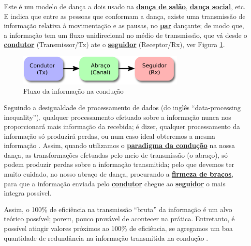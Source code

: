 \begin{definition} 
\label{def:ParadigmaConducao} 
Este é um modelo de dança a dois usado na \hyperref[def:DancaSalao]{\textbf{dança de salão}},
\hyperref[def:DancaSocial]{\textbf{dança social}}, etc. 
E indica que entre as pessoas que conformam a dança, 
existe uma transmissão de informação relativa à movimentação e as pausas, no \hyperref[def:Par]{\textbf{par}} dançante; 
de modo que, a informação tem um fluxo unidirecional no médio de transmissão,
que vá desde o \hyperref[def:Condutor]{\textbf{condutor}} (Transmissor/Tx) 
ate o \hyperref[def:Seguidor]{\textbf{seguidor}} (Receptor/Rx),
ver Figura \ref{fig:paradigmaconducion}. 
\end{definition}

\begin{figure}[!ht]
     \centering
\includegraphics[width=0.75\textwidth]{chapters/cap-normas/modeloconducao.eps}
\caption{Fluxo da informação na condução}
\label{fig:paradigmaconducion}
\end{figure}

Seguindo a desigualdade de processamento de dados (do inglês ``data-processing inequality''),
qualquer processamento efetuado sobre a informação nunca nos proporcionará mais informação da recebida;
é dizer, qualquer processamento da informação só produzirá perdas,
ou num caso ideal obteremos a mesma informação  \cite[pp. 34]{cover2006elements}.
Assim, quando utilizamos o \hyperref[def:ParadigmaConducao]{\textbf{paradigma da condução}} na nossa dança,
as transformações efetuadas pelo meio de transmissão (o abraço), 
só podem produzir perdas sobre a informação transmitida;
pelo que devemos ter muito cuidado, no nosso abraço de dança,
procurando a \hyperref[def:brazosfirmes]{\textbf{firmeza de braços}}, 
para que a informação enviada pelo \hyperref[def:Condutor]{\textbf{condutor}} 
chegue ao \hyperref[def:Seguidor]{\textbf{seguidor}} o mais integra possível.

Assim, o 100\% de eficiência na transmissão ``bruta'' da informação
é  um alvo teórico possível; porem, pouco provável de acontecer na prática.
Entretanto, é possível atingir valores próximos ao 100\% de eficiência,
se agregamos um boa quantidade de redundância na informação transmitida na condução  \cite[pp. 184,219]{cover2006elements}.
 

